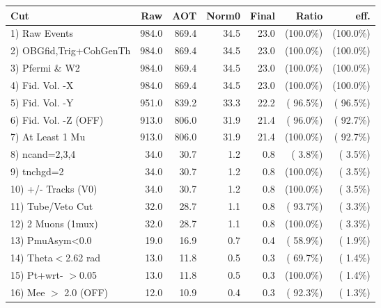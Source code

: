  \begin{table}[h!]\centering
 \begin{tabular}{||l||r|r|r|r|r|r||}
 \hline
 \hline
 Cut & Raw & AOT & Norm0 & Final & Ratio & eff.       \\
 \hline
  1) Raw Events           &        984.0 &        869.4 &         34.5 &         23.0 & (100.0\%) & (100.0\%) \\
  2) OBGfid,Trig+CohGenTh &        984.0 &        869.4 &         34.5 &         23.0 & (100.0\%) & (100.0\%) \\
  3) Pfermi \& W2         &        984.0 &        869.4 &         34.5 &         23.0 & (100.0\%) & (100.0\%) \\
  4) Fid. Vol. -X         &        984.0 &        869.4 &         34.5 &         23.0 & (100.0\%) & (100.0\%) \\
  5) Fid. Vol. -Y         &        951.0 &        839.2 &         33.3 &         22.2 & ( 96.5\%) & ( 96.5\%) \\
  6) Fid. Vol. -Z (OFF)   &        913.0 &        806.0 &         31.9 &         21.4 & ( 96.0\%) & ( 92.7\%) \\
  7) At Least 1 Mu        &        913.0 &        806.0 &         31.9 &         21.4 & (100.0\%) & ( 92.7\%) \\
  8) ncand=2,3,4          &         34.0 &         30.7 &          1.2 &          0.8 & (  3.8\%) & (  3.5\%) \\
  9) tnchgd=2             &         34.0 &         30.7 &          1.2 &          0.8 & (100.0\%) & (  3.5\%) \\
 10) +/- Tracks (V0)      &         34.0 &         30.7 &          1.2 &          0.8 & (100.0\%) & (  3.5\%) \\
 11) Tube/Veto Cut        &         32.0 &         28.7 &          1.1 &          0.8 & ( 93.7\%) & (  3.3\%) \\
 12) 2 Muons (1mux)       &         32.0 &         28.7 &          1.1 &          0.8 & (100.0\%) & (  3.3\%) \\
 13) PmuAsym<0.0          &         19.0 &         16.9 &          0.7 &          0.4 & ( 58.9\%) & (  1.9\%) \\
 14) Theta$<$2.62 rad     &         13.0 &         11.8 &          0.5 &          0.3 & ( 69.7\%) & (  1.4\%) \\
 15) Pt+wrt- $>$0.05      &         13.0 &         11.8 &          0.5 &          0.3 & (100.0\%) & (  1.4\%) \\
 16) Mee $>$ 2.0  (OFF)   &         12.0 &         10.9 &          0.4 &          0.3 & ( 92.3\%) & (  1.3\%) \\

\end{tabular}
\end{table}
